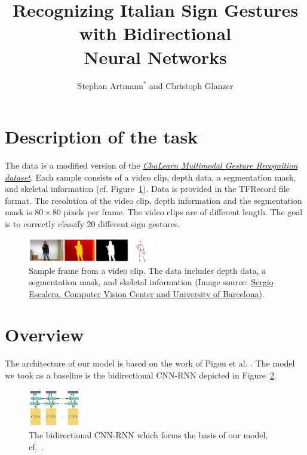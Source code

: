 \documentclass[sigconf]{acmart}
\title{Recognizing Italian Sign Gestures with Bidirectional\\Neural Networks}
\author{Stephan Artmann{\normalsize${}^{\ast}$} and Christoph Glanzer}
\begin{document}
	\maketitle
	
	\section{Description of the task}
	The data is a modified version of the \href{http://chalearnlap.cvc.uab.es/dataset/13/description/}{\textit{ChaLearn Multimodal Gesture Recognition dataset}}. Each sample consists of a video clip, depth data, a segmentation mask, and skeletal information (cf. Figure~\ref{fig:sample}). Data is provided in the TFRecord file format. The resolution of the video clip, depth information and the segmentation mask is $80 \times 80$ pixels per frame. The video clips are of different length. The goal is to correctly classify 20 different sign gestures.
	\begin{figure}[h!]
		\begin{center}
			\includegraphics[width=0.5\textwidth,height=0.5\textheight,keepaspectratio]{sample.png}
		\end{center}
		\caption{Sample frame from a video clip. The data includes depth data, a segmentation mask, and skeletal information (Image source: \href{http://chalearnlap.cvc.uab.es/dataset/13/description/}{Sergio Escalera, Computer Vision Center and University of Barcelona}).}
		\label{fig:sample}
	\end{figure}
	
	\section{Overview}
	The architecture of our model is based on the work of Pigou et al. \cite{pigou}. The model we took as a baseline is the bidirectional CNN-RNN depicted in Figure~\ref{fig:model}.
	
	\begin{figure}[h!]
		\begin{center}
			\includegraphics[width=0.2\textwidth,height=0.2\textheight,keepaspectratio]{model.png}
		\end{center}
		\caption{The bidirectional CNN-RNN which forms the basis of our model, cf.~\citep[Figure 1c]{pigou}.}
		\label{fig:model}
	\end{figure}
	
\end{document}
